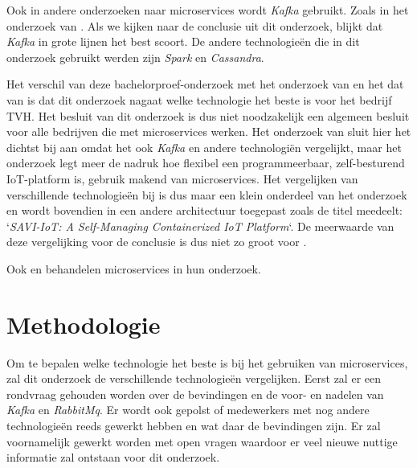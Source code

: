 Ook in andere onderzoeken naar microservices wordt \emph{Kafka} gebruikt. Zoals in het onderzoek van \textcite{Khazaei2017}. Als we kijken naar de conclusie uit dit onderzoek, blijkt dat \emph{Kafka} in grote lijnen het best scoort. De andere technologieën die in dit onderzoek gebruikt werden zijn \emph{Spark} en \emph{Cassandra}.

Het verschil van deze bachelorproef-onderzoek met het onderzoek van \textcite{Shadija2017} en het dat van \textcite{Khazaei2017} is dat dit onderzoek nagaat welke technologie het beste is voor het bedrijf TVH. Het besluit van dit onderzoek is dus niet noodzakelijk een algemeen besluit voor alle bedrijven die met microservices werken. Het onderzoek van \textcite{Khazaei2017} sluit hier het dichtst bij aan omdat het ook \emph{Kafka} en andere technologiën vergelijkt, maar het onderzoek legt meer de nadruk hoe flexibel een programmeerbaar, zelf-besturend IoT-platform is, gebruik makend van microservices. Het vergelijken van verschillende technologieën bij \textcite{Khazaei2017} is dus maar een klein onderdeel van het onderzoek en wordt bovendien in een andere architectuur toegepast zoals de titel meedeelt: `\emph{SAVI-IoT: A Self-Managing Containerized IoT Platform}`. De meerwaarde van deze vergelijking voor de conclusie is dus niet zo groot voor \textcite{Khazaei2017}.

Ook \textcite{Nycander2015} en \textcite{Cherradi2017} behandelen microservices in hun onderzoek.




\section{Methodologie}
\label{sec:methodologie}
Om te bepalen welke technologie het beste is bij het gebruiken van microservices, zal dit onderzoek de verschillende technologieën vergelijken. Eerst zal er een rondvraag gehouden worden over de bevindingen en de voor- en nadelen van \emph{Kafka} en \emph{RabbitMq}. Er wordt ook gepolst of medewerkers met nog andere technologieën reeds gewerkt hebben en wat daar de bevindingen zijn. Er zal voornamelijk gewerkt worden met open vragen waardoor er veel nieuwe nuttige informatie zal ontstaan voor dit onderzoek.

